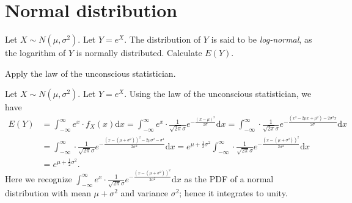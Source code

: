 \section{Normal distribution}
\label{sec:section-5.6}
	
	\begin{exercise}
		Let $X \sim N(\mu, \sigma^2)$. Let $Y = e^X$. The distribution of $Y$ is said to be \emph{log-normal}, as the logarithm of $Y$ is normally distributed. Calculate $E(Y)$.
		\begin{hint}
			Apply the law of the unconscious statistician.
		\end{hint}
		\begin{solution}
			Let $X \sim N(\mu, \sigma^2)$. Let $Y = e^X$. Using the law of the unconscious statistician, we have
			\begin{align*}
				E(Y) & = \int_{-\infty}^{\infty} e^x \cdot f_X(x) \mathrm{d}x = \int_{-\infty}^{\infty} e^x \cdot \frac{1}{\sqrt{2 \pi} \sigma} e^{- \frac{(x - \mu)^2}{2 \sigma}} \mathrm{d}x = \int_{-\infty}^{\infty} \cdot \frac{1}{\sqrt{2 \pi} \sigma} e^{- \frac{(x^2 - 2 \mu x + \mu^2) - 2 \sigma^2 x}{2 \sigma}} \mathrm{d}x \\
				& = \int_{-\infty}^{\infty} \cdot \frac{1}{\sqrt{2 \pi} \sigma} e^{- \frac{(x - (\mu + \sigma^2))^2 - 2 \mu \sigma^2 - \sigma^4}{2 \sigma^2}} \mathrm{d}x = e^{\mu + \frac{1}{2} \sigma^2} \int_{-\infty}^{\infty} \cdot \frac{1}{\sqrt{2 \pi} \sigma} e^{- \frac{(x - (\mu + \sigma^2))^2}{2 \sigma^2}} \mathrm{d}x \\
				& = e^{\mu + \frac{1}{2} \sigma^2}.
			\end{align*}
			Here we recognize $\int_{-\infty}^{\infty} e^x \cdot \frac{1}{\sqrt{2 \pi} \sigma} e^{- \frac{(x - (\mu + \sigma^2))^2}{2 \sigma^2}} \mathrm{d}x$ as the PDF of a normal distribution with mean $\mu+\sigma^2$ and variance $\sigma^2$; hence it integrates to unity.
		\end{solution}
	\end{exercise}
	
